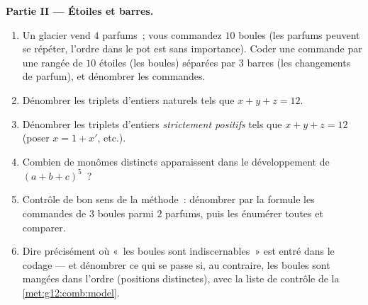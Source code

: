 \begin{problem}
\medskip
\noindent\textbf{Partie II --- Étoiles et barres.}
\begin{enumerate}[resume]
  \item Un glacier vend $4$ parfums~; vous commandez $10$ boules
        (les parfums peuvent se répéter, l'ordre dans le pot est
        sans importance). Coder une commande par une rangée de $10$
        étoiles (les boules) séparées par $3$ barres (les changements
        de parfum), et dénombrer les commandes.
  \item Dénombrer les triplets d'entiers naturels tels que
        $x + y + z = 12$.
  \item Dénombrer les triplets d'entiers \emph{strictement
        positifs} tels que $x + y + z = 12$ (poser $x = 1 + x'$,
        etc.).
  \item Combien de monômes distincts apparaissent dans le
        développement de $(a + b + c)^5$~?
  \item Contrôle de bon sens de la méthode~: dénombrer par la
        formule les commandes de $3$ boules parmi $2$ parfums, puis
        les énumérer toutes et comparer.
  \item Dire précisément où «~les boules sont indiscernables~» est
        entré dans le codage --- et dénombrer ce qui se passe si, au
        contraire, les boules sont mangées dans l'ordre (positions
        distinctes), avec la liste de contrôle de la
        \cref{met:g12:comb:model}.
\end{enumerate}


\end{problem}
